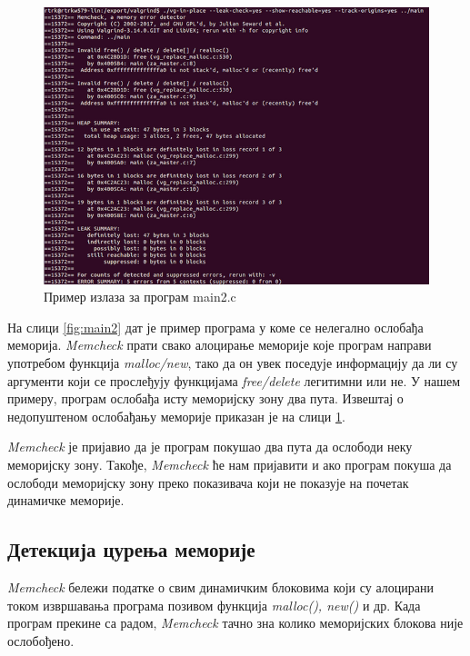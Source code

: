 \documentclass[12pt,oneside]{memoir}
\begin{document}
\begin{figure}[h!]
\begin{center}
\includegraphics[scale=0.75]{slika6.png}
\end{center}
\caption{Пример излаза за програм main2.c}
\label{fig:memcheck2}
\end{figure}

\indent На слици \ref{fig:main2} дат је пример програма у коме се нелегално ослобађа меморија. \textit{Memcheck} прати свако алоцирање меморије које програм направи употребом функција \textit{malloc/new}, тако да он увек поседује информацију да ли су аргументи који се прослеђују функцијама \textit{free/delete} легитимни или не. У нашем примеру, програм ослобађа исту меморијску зону два пута. Извештај о недопуштеном ослобађању меморије приказан је на слици \ref{fig:memcheck2}.

\indent \textit{Memcheck} је пријавио да је програм покушао два пута да ослободи неку меморијску зону.  Такође, \textit{Memcheck} ће нам пријавити и ако програм покуша да ослободи меморијску зону преко показивача који не показује на почетак динамичке меморије.

\subsection{Детекција цурења меморије}

\indent \textit{Memcheck} бележи податке о свим динамичким блоковима који су алоцирани током извршавања програма позивом функција \textit{malloc(), new()} и др. Када програм прекине са радом, \textit{Memcheck} тачно зна колико меморијских блокова није ослобођено.
\end{document}
